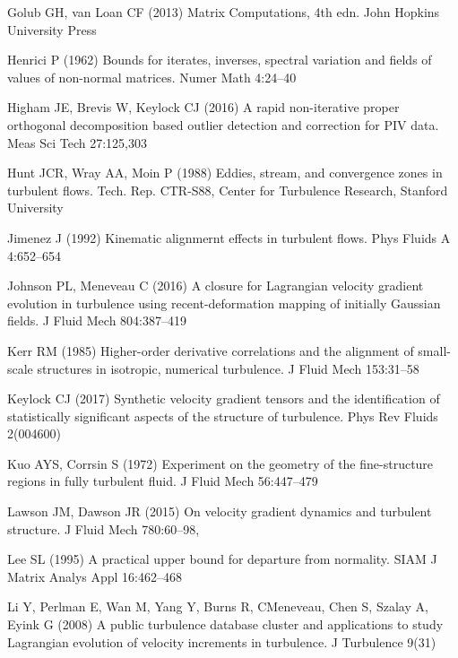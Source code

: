 \documentclass[preprint,amssymb,amsmath,aip,cha]{revtex4-1}
\begin{document}
\begin{thebibliography}{37}
{Golub} GH, {van Loan} CF (2013) Matrix Computations, 4th edn. John Hopkins
  University Press

{Henrici} P (1962) Bounds for iterates, inverses, spectral variation and fields
  of values of non-normal matrices. Numer Math 4:24--40

{Higham} JE, {Brevis} W, {Keylock} CJ (2016) A rapid non-iterative proper
  orthogonal decomposition based outlier detection and correction for {PIV}
  data. Meas Sci Tech 27:125,303

{Hunt} JCR, {Wray} AA, {Moin} P (1988) Eddies, stream, and convergence zones in
  turbulent flows. Tech. Rep. CTR-S88, Center for Turbulence Research, Stanford
  University

{Jimenez} J (1992) Kinematic alignmernt effects in turbulent flows. Phys Fluids
  A 4:652--654

{Johnson} PL, {Meneveau} C (2016) A closure for {L}agrangian velocity gradient
  evolution in turbulence using recent-deformation mapping of initially
  {G}aussian fields. J Fluid Mech 804:387--419

{Kerr} RM (1985) Higher-order derivative correlations and the alignment of
  small-scale structures in isotropic, numerical turbulence. J Fluid Mech
  153:31--58

{Keylock} CJ (2017) Synthetic velocity gradient tensors and the identification
  of statistically significant aspects of the structure of turbulence. Phys Rev
  Fluids 2(004600)

{Kuo} AYS, {Corrsin} S (1972) Experiment on the geometry of the fine-structure
  regions in fully turbulent fluid. J Fluid Mech 56:447--479

{Lawson} JM, {Dawson} JR (2015) On velocity gradient dynamics and turbulent
  structure. J Fluid Mech 780:60--98, 

{Lee} SL (1995) A practical upper bound for departure from normality. {SIAM} J
  Matrix Analys Appl 16:462--468

{Li} Y, {Perlman} E, {Wan} M, {Yang} Y, {Burns} R, C{Meneveau}, {Chen} S,
  {Szalay} A, {Eyink} G (2008) A public turbulence database cluster and
  applications to study {L}agrangian evolution of velocity increments in
  turbulence. J Turbulence 9(31)


\end{thebibliography}
\end{document}
